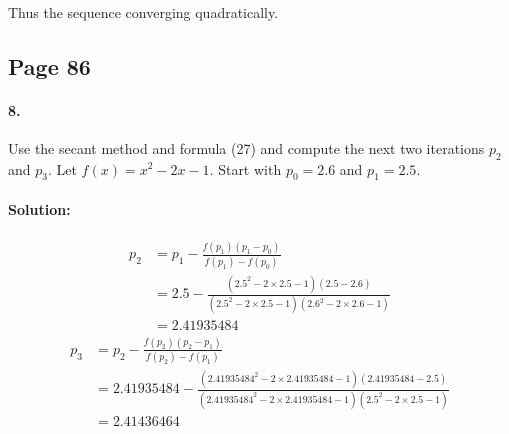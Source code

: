 \documentclass{article}  %
\begin{document}
        \paragraph{}Thus the sequence converging quadratically.
        \subsection*{Page 86}
        \paragraph{8.}Use the secant method and formula (27) and compute the next two iterations $p_2$ and $p_3$. Let $f(x) = x^2 - 2x - 1$. Start with $p_0 = 2.6$ and $p_1 = 2.5$. 
        \paragraph{Solution:}
        \begin{align*}
        p_2 &= p_1 - \frac{f(p_1)(p_1 - p_0)}{f(p_1) - f(p_0)} \\
        &= 2.5 - \frac{(2.5^2 - 2 \times 2.5 -1)(2.5 - 2.6)}{(2.5^2 - 2 \times 2.5 -1)(2.6^2 - 2 \times 2.6 -1)} \\ 
        &= 2.41935484
        \end{align*}
        \begin{align*}
        p_3 &= p_2 - \frac{f(p_2)(p_2 - p_1)}{f(p_2) - f(p_1)} \\
        &= 2.41935484 - \frac{(2.41935484^2 - 2 \times 2.41935484 -1)(2.41935484 - 2.5)}{(2.41935484^2 - 2 \times 2.41935484 -1)(2.5^2 - 2 \times 2.5 -1)} \\ 
        &= 2.41436464
        \end{align*}
\end{document}
